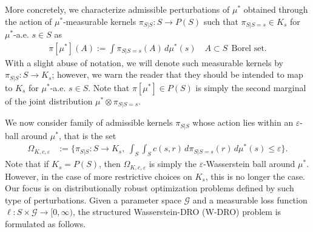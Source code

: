 \documentclass{article}
\newcommand{\Okc}{\Omega_{K, c, \varepsilon}}
\theoremstyle{definition}
\theoremstyle{remarksty}
\begin{document}
More concretely, we characterize admissible perturbations of $\mu^*$ obtained through the action of $\mu^*$-measurable kernels $\pi_{S|S} : S \rightarrow P(S)$ such that $\pi_{S|S=s} \in K_s$ for $\mu^*$-a.e. $s \in S$ as 
\begin{align*}
    \pi[\mu^*](A) := \int \pi_{S|S=s}(A)\, d\mu^*(s)  \quad A\subset S \ \ \text{Borel set}.
\end{align*}
With a slight abuse of notation, we will denote such measurable kernels by $\pi_{S|S} : S \rightarrow K_s$; however, we warn the reader that they should be intended to map to $K_s$ for $\mu^*$-a.e. $s \in S$.
Note that $\pi[\mu^*] \in P(S)$ is simply the second marginal of the joint distribution $\mu^* \otimes \pi_{S|S=s}$. 

We now consider family of admissible kernels $\pi_{S|S}$ whose action lies within an $\varepsilon$-ball around $\mu^*$, that is the set 
\begin{align*}
    \Okc &:= \Big\{\pi_{S|S}: S \rightarrow K_s,\ \int_S \int_S c(s,r)\,d\pi_{S|S=s}(r)\,d\mu^*(s) \leq \varepsilon\Big\}.
\end{align*}
Note that if $K_s = P(S)$, then $\Okc$ is simply the $\varepsilon$-Wasserstein ball around $\mu^*$. However, in the case of more restrictive choices on $K_s$, this is no longer the case.
Our focus is on distributionally robust optimization problems defined by such type of perturbations. Given a parameter space $\mathcal{G}$ and a measurable loss function $\ell: S \times \mathcal{G} \to [0, \infty)$, the structured Wasserstein-DRO (W-DRO) problem is formulated as follows.
\end{document}

